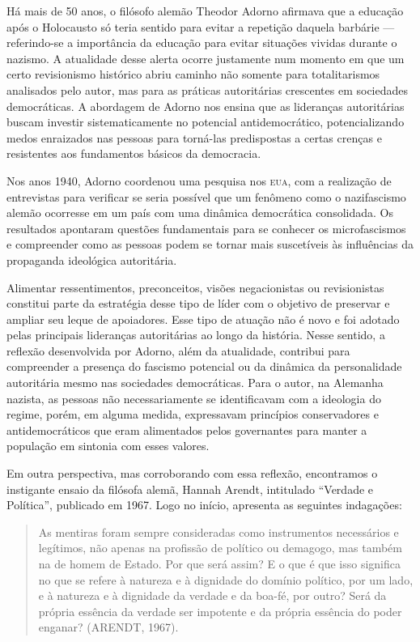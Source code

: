 Há mais de 50 anos, o filósofo alemão Theodor Adorno afirmava que a
educação após o Holocausto só teria sentido para evitar a repetição
daquela barbárie --- referindo-se a importância da educação para evitar
situações vividas durante o nazismo. A atualidade desse alerta ocorre
justamente num momento em que um certo revisionismo histórico abriu
caminho não somente para totalitarismos analisados pelo autor, mas para
as práticas autoritárias crescentes em sociedades democráticas. A
abordagem de Adorno nos ensina que as lideranças autoritárias buscam
investir sistematicamente no potencial antidemocrático, potencializando
medos enraizados nas pessoas para torná-las predispostas a certas
crenças e resistentes aos fundamentos básicos da democracia.

Nos anos 1940, Adorno coordenou uma pesquisa nos \textsc{eua}, com a realização
de entrevistas para verificar se seria possível que um fenômeno como o
nazifascismo alemão ocorresse em um país com uma dinâmica democrática
consolidada. Os resultados apontaram questões fundamentais para se
conhecer os microfascismos e compreender como as pessoas podem se tornar
mais suscetíveis às influências da propaganda ideológica autoritária.

Alimentar ressentimentos, preconceitos, visões negacionistas ou
revisionistas constitui parte da estratégia desse tipo de líder com o
objetivo de preservar e ampliar seu leque de apoiadores. Esse tipo de
atuação não é novo e foi adotado pelas principais lideranças
autoritárias ao longo da história. Nesse sentido, a reflexão
desenvolvida por Adorno, além da atualidade, contribui para compreender a
presença do fascismo potencial ou da dinâmica da personalidade
autoritária mesmo nas sociedades democráticas. Para o autor, na Alemanha
nazista, as pessoas não necessariamente se identificavam com a ideologia
do regime, porém, em alguma medida, expressavam princípios conservadores
e antidemocráticos que eram alimentados pelos governantes para manter a
população em sintonia com esses valores.

Em outra perspectiva, mas corroborando com essa reflexão, encontramos o
instigante ensaio da filósofa alemã, Hannah Arendt, intitulado ``Verdade e
Política'', publicado em 1967. Logo no início, apresenta as seguintes
indagações:

\begin{quote}
As mentiras foram sempre consideradas como instrumentos necessários e
legítimos, não apenas na profissão de político ou demagogo, mas também
na de homem de Estado. Por que será assim? E o que é que isso significa
no que se refere à natureza e à dignidade do domínio político, por um
lado, e à natureza e à dignidade da verdade e da boa-fé, por outro? Será
da própria essência da verdade ser impotente e da própria essência do
poder enganar? (ARENDT, 1967).
\end{quote}

